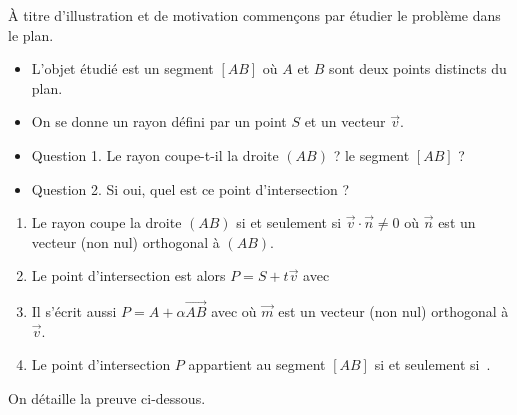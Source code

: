 \documentclass[11pt,class=report,crop=false]{standalone}
\begin{document}
À titre d'illustration et de motivation commençons par étudier le problème dans le plan.
\begin{itemize}
  \item L'objet étudié est un segment $[AB]$ où $A$ et $B$ sont deux points distincts du plan.
  \item On se donne un rayon défini par un point $S$ et un vecteur $\vec v$.
  \item Question 1. Le rayon coupe-t-il la droite $(AB)$ ? le segment $[AB]$ ?
  \item Question 2. Si oui, quel est ce point d'intersection ?
\end{itemize}



\begin{proposition}
\sauteligne
\begin{enumerate}
  \item Le rayon coupe la droite $(AB)$ si et seulement si $\vec v \cdot \vec n \neq 0$ où $\vec n$ est un vecteur (non nul) orthogonal à $(AB)$.
  \item Le point d'intersection est alors $P = S + t\vec v$ avec 
  \item Il s'écrit aussi $P = A + \alpha \overrightarrow{AB}$ avec 
  où $\vec m$ est un vecteur (non nul) orthogonal à $\vec v$.
  \item Le point d'intersection $P$ appartient au segment $[AB]$ si et seulement si \,.
\end{enumerate}
\end{proposition}

On détaille la preuve ci-dessous.
\end{document}
